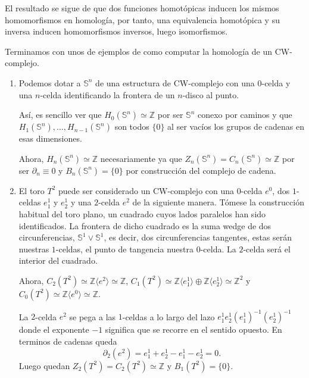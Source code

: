 El resultado se sigue de que dos funciones homotópicas inducen los mismos homomorfismos en homología, por tanto, una equivalencia homotópica y su inversa inducen homomorfismos inversos, luego isomorfismos.

Terminamos con unos de ejemplos de como computar la homología de un CW-complejo.

\begin{example}\label{ejemplos_hom_celular}
    \hfill
    \begin{enumerate}[label=(\roman*)]
        \item Podemos dotar a $\mathbb{S}^n$ de una estructura de CW-complejo con una $0$-celda y una $n$-celda identificando la frontera de un $n$-disco al punto.
        
        Así, es sencillo ver que $H_0(\mathbb{S}^n)\simeq \mathbb{Z}$ por ser $\mathbb{S}^n$ conexo por caminos y que $H_1(\mathbb{S}^n), \dots, H_{n-1}(\mathbb{S}^n)$ son todos $\{0\}$ al ser vacíos los grupos de cadenas en esas dimensiones.

        Ahora, $H_{n}(\mathbb{S}^n)\simeq \mathbb{Z}$ necesariamente ya que $Z_n(\mathbb{S}^n)=C_n(\mathbb{S}^n)\simeq \mathbb{Z}$ por ser $\partial_n \equiv 0$ y $B_n(\mathbb{S}^n)=\{0\}$ por construcción del complejo de cadena.
        \item El toro $T^2$ puede ser considerado un CW-complejo con una $0$-celda $e^0$, dos $1$-celdas $e^1_1$ y $e^1_2$ y una $2$-celda $e^2$ de la siguiente manera. Tómese la construcción habitual del toro plano, un cuadrado cuyos lados paralelos han sido identificados. La frontera de dicho cuadrado es la suma wedge de dos circunferencias, $\mathbb{S}^1\vee \mathbb{S}^1$, es decir, dos circunferencias tangentes, estas serán nuestras $1$-celdas, el punto de tangencia nuestra $0$-celda. La $2$-celda será el interior del cuadrado.
        
        Ahora, $C_2(T^2)\simeq \mathbb{Z}\langle e^2 \rangle \simeq \mathbb{Z}$, $C_1(T^2)\simeq \mathbb{Z}\langle e^1_1 \rangle \oplus \mathbb{Z}\langle e^1_2 \rangle \simeq \mathbb{Z}^2$ y $C_0(T^2)\simeq \mathbb{Z}\langle e^0 \rangle\simeq \mathbb{Z}$.

        La $2$-celda $e^2$ se pega a las $1$-celdas a lo largo del lazo $e^1_1 e^1_2 (e^1_1)^{-1} (e^1_2)^{-1} $ donde el exponente $-1$ significa que se recorre en el sentido opuesto. En terminos de cadenas queda
        \begin{equation*}
            \partial_2(e^2) = e^1_1 + e^1_2 - e^1_1 - e^1_2 = 0.
        \end{equation*}
        Luego quedan $Z_2(T^2)=C_2(T^2)\simeq \mathbb{Z}$ y $B_1(T^2)=\{0\}$. 


\end{enumerate}
\end{example}
